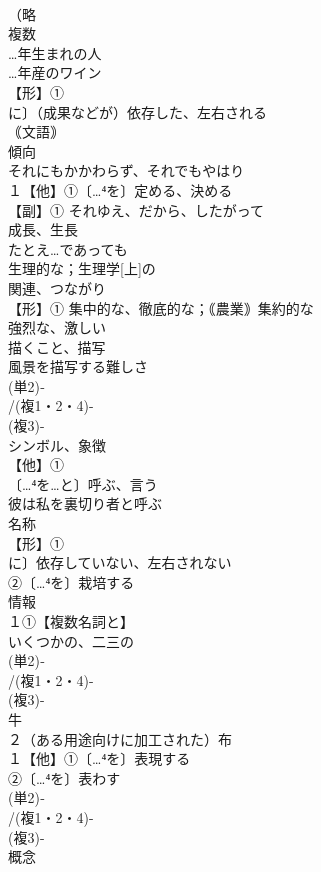 \documentclass[8pt]{extreport}
\begin{document}
\begin{CJK}{UTF8}{min}
\\	（略 
\\	複数
\\	…年生まれの人　　
\\	…年産のワイン
\\	【形】①
\\	に〕（成果などが）依存した、左右される 
\\	｟文語｠ 
\\	傾向 
\\	それにもかかわらず、それでもやはり 
\\	１【他】①〔…⁴を〕定める、決める 
\\	【副】① それゆえ、だから、したがって 
\\	成長、生長 
\\	たとえ…であっても
\\	生理的な；生理学[上]の 
\\	関連、つながり 
\\	【形】① 集中的な、徹底的な；｟農業｠集約的な 
\\	強烈な、激しい
\\	描くこと、描写 
\\	風景を描写する難しさ
\\	(単2)‐
\\	/(複1・2・4)-
\\	(複3)-
\\	シンボル、象徴 
\\	【他】①
\\	〔…⁴を…と〕呼ぶ、言う 
\\	彼は私を裏切り者と呼ぶ 
\\	名称
\\	【形】①
\\	に〕依存していない、左右されない 
\\	②〔…⁴を〕栽培する 
\\	情報
\\	１①【複数名詞と】
\\	いくつかの、二三の
\\	(単2)‐
\\	/(複1・2・4)-
\\	(複3)-
\\	牛
\\	２（ある用途向けに加工された）布 
\\	１【他】①〔…⁴を〕表現する 
\\	②〔…⁴を〕表わす
\\	(単2)‐
\\	/(複1・2・4)-
\\	(複3)-
\\	概念 

\end{CJK}
\end{document}
